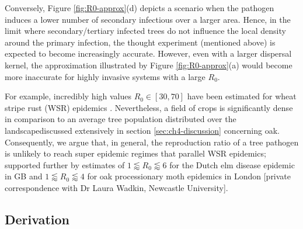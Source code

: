 Conversely, Figure \ref{fig:R0-approx}(d) depicts a scenario when the pathogen induces a lower number of secondary infectious over a larger area. Hence, in the limit where secondary/tertiary infected trees do not influence the local density around the primary infection, the thought experiment (mentioned above) is expected to become increasingly accurate. 
However, even with a larger dispersal kernel, the approximation illustrated by Figure \ref{fig:R0-approx}(a) would become more inaccurate for highly invasive systems with a large $R_0$. 

For example, incredibly high values $R_0\in [30, 70]$ have been estimated for wheat stripe rust (WSR) epidemics \cite{severns2019consequences, mikaberidze2016invasiveness}. Nevertheless, 
a field of crops is significantly dense in comparison to an average tree population distributed over the landscape\textemdash discussed extensively in section \ref{sec:ch4-discussion} concerning oak. Consequently, we argue that, in general, the reproduction ratio of a tree pathogen is unlikely to reach super epidemic regimes that parallel WSR epidemics;
supported further by estimates of $1 \lessapprox R_0 \lessapprox 6$ for the Dutch elm disease epidemic in GB \cite{swinton1996dutch} and $1 \lessapprox R_0 \lessapprox 4$ for oak processionary moth epidemics in London [private correspondence with Dr Laura Wadkin, Newcastle University].

\subsection{Derivation}

